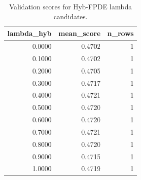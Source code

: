 \begin{table}[t]
\caption{Validation scores for Hyb-FPDE lambda candidates.}
\label{tab:lambda_distribution_computed}
\centering
\begin{tabular}{rrr}
\toprule
lambda\_hyb & mean\_score & n\_rows \\
\midrule
0.0000 & 0.4702 & 1 \\
0.1000 & 0.4702 & 1 \\
0.2000 & 0.4705 & 1 \\
0.3000 & 0.4717 & 1 \\
0.4000 & 0.4721 & 1 \\
0.5000 & 0.4720 & 1 \\
0.6000 & 0.4720 & 1 \\
0.7000 & 0.4721 & 1 \\
0.8000 & 0.4720 & 1 \\
0.9000 & 0.4715 & 1 \\
1.0000 & 0.4719 & 1 \\
\bottomrule
\end{tabular}

\end{table}
